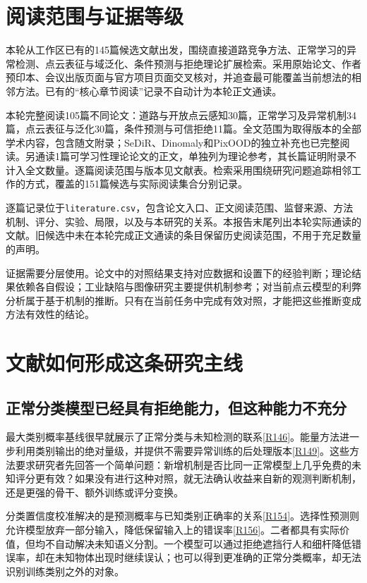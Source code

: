 \documentclass[11pt,a4paper]{article}
\newcommand{\paper}[1]{\allowbreak\hyperlink{#1}{[#1]}\allowbreak}
\begin{document}
\section{阅读范围与证据等级}

本轮从工作区已有的145篇候选文献出发，围绕直接道路竞争方法、正常学习的异常检测、点云表征与域泛化、条件预测与拒绝理论扩展检索。采用原始论文、作者预印本、会议出版页面与官方项目页面交叉核对，并追查最可能覆盖当前想法的相邻方法。已有的“核心章节阅读”记录不自动计为本轮正文通读。

本轮完整阅读105篇不同论文：道路与开放点云感知30篇，正常学习及异常机制34篇，点云表征与泛化30篇，条件预测与可信拒绝11篇。全文范围为取得版本的全部学术内容，包含随文附录；SeDiR、Dinomaly和PixOOD的独立补充也已完整阅读。另通读1篇可学习性理论论文的正文，单独列为理论参考，其长篇证明附录不计入全文数量。逐篇阅读范围与版本见文献表。检索采用围绕研究问题追踪相邻工作的方式，覆盖的151篇候选与实际阅读集合分别记录。

逐篇记录位于\texttt{literature.csv}，包含论文入口、正文阅读范围、监督来源、方法机制、评分、实验、局限，以及与本研究的关系。本报告末尾列出本轮实际通读的文献。旧候选中未在本轮完成正文通读的条目保留历史阅读范围，不用于充足数量的声明。

证据需要分层使用。论文中的对照结果支持对应数据和设置下的经验判断；理论结果依赖各自假设；工业缺陷与图像研究主要提供机制参考；对当前点云模型的利弊分析属于基于机制的推断。只有在当前任务中完成有效对照，才能把这些推断变成方法有效性的结论。

\section{文献如何形成这条研究主线}

\subsection{正常分类模型已经具有拒绝能力，但这种能力不充分}

最大类别概率基线很早就展示了正常分类与未知检测的联系\paper{R146}。能量方法进一步利用类别输出的绝对量级，并提供不需要异常训练的后处理版本\paper{R149}。这些方法要求研究者先回答一个简单问题：新增机制是否比同一正常模型上几乎免费的未知评分更有效？如果没有进行这种对照，就无法确认收益来自新的观测判断机制，还是更强的骨干、额外训练或评分变换。

分类置信度校准解决的是预测概率与已知类别正确率的关系\paper{R154}。选择性预测则允许模型放弃一部分输入，降低保留输入上的错误率\paper{R156}。二者都具有实际价值，但均不自动解决未知语义分割。一个模型可以通过拒绝遮挡行人和细杆降低错误率，却在未知物体出现时继续误认；也可以得到更准确的正常分类概率，却无法识别训练类别之外的对象。
\end{document}
